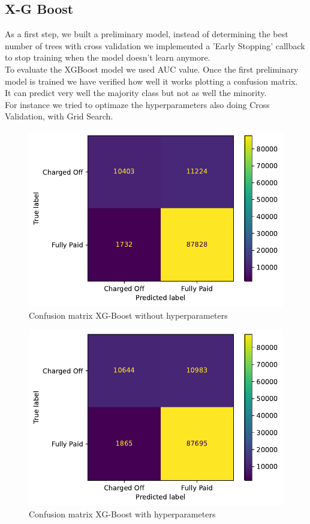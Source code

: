\documentclass[french]{scrartcl}
\begin{document}
\subsection{X-G Boost}
As a first step, we built a preliminary model, instead of determining the best number of trees with cross validation we implemented a ’Early Stopping’ callback to stop training when the model doesn’t learn anymore.\\ 
To evaluate the XGBoost model we used AUC value. Once the first preliminary model is trained we have verified how well it works plotting a confusion matrix.\\
It can predict very well the majority class but not as well the minority.\\
For instance we tried to optimaze the hyperparameters also doing Cross Validation, with Grid Search.\\
	\begin{figure}[h!]
	\centering
	\includegraphics[scale=0.8]{figures/(5)basic_balanced_XGBoost.pdf}
	\caption{Confusion matrix XG-Boost without hyperparameters}
\end{figure}
	\begin{figure}[h!]
	\centering
	\includegraphics[scale=0.8]{figures/(6)hyper_balanced_XGBoost.pdf}
	\caption{Confusion matrix XG-Boost with hyperparameters}
\end{figure}
\end{document}
